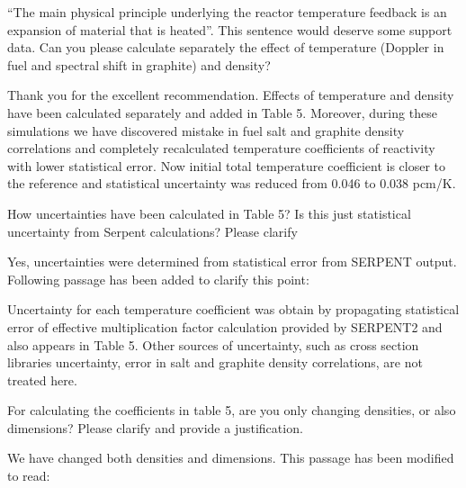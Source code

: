 \documentclass[answers,11pt]{exam}
\begin{document}
\begin{questions}
        \question ``The main physical principle underlying the reactor 
        temperature feedback is an expansion of material that is heated''. This 
        sentence would deserve some support data. Can you please calculate 
        separately the effect of temperature (Doppler in fuel and spectral 
        shift in graphite) and density?
        \begin{solution}
                Thank you for the excellent recommendation. Effects of temperature
                 and density have been calculated separately and added in Table 5.
                 Moreover, during these simulations we have discovered mistake in 
                 fuel salt and graphite density correlations and completely 
                 recalculated temperature coefficients of reactivity with lower 
                 statistical error. Now initial total temperature coefficient is 
                 closer to the reference and statistical uncertainty was reduced 
                 from 0.046 to 0.038 pcm/K.
        \end{solution}


        \question How uncertainties have been calculated in Table 5? Is this 
        just statistical uncertainty from Serpent calculations? Please clarify
        \begin{solution}
                Yes, uncertainties were determined from statistical error 
                from SERPENT output. Following passage has been added to clarify
                 this point:
                 
                 Uncertainty for each temperature coefficient was obtain by 
                 propagating statistical error of effective multiplication factor 
                 calculation provided by SERPENT2 and also appears in Table 5. 
                 Other sources of uncertainty, such as cross section libraries 
				 uncertainty, error in salt and graphite density correlations, 
				 are not treated here.
        \end{solution}


        \question For calculating the coefficients in table 5, are you only 
        changing densities, or also dimensions? Please clarify and provide a 
        justification.  
        \begin{solution}
        		We have changed both densities and dimensions. This passage 
        		has been modified to read:
        		

\end{solution}
\end{questions}
\end{document}
